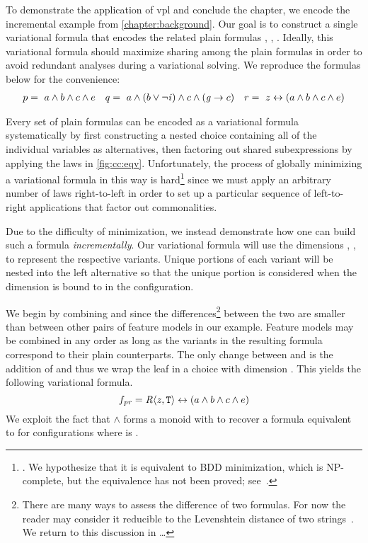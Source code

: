 %
To demonstrate the application of \ac{vpl} and conclude the chapter, we encode
the incremental example from \autoref{chapter:background}. Our goal is to
construct a single variational formula that encodes the related plain formulas
\pV{}, \qV{}, \rV{}. Ideally, this variational formula should maximize sharing
among the plain formulas in order to avoid redundant analyses during a
variational solving. We reproduce the formulas below for the convenience:
%
\begin{align*}
  p =\ a \wedge b \wedge c \wedge e && q=\ a \wedge (b \vee \neg \mathit{i}{}) \wedge c \wedge (\mathit{g}{} \rightarrow c) && r =~z \leftrightarrow (a \wedge b \wedge c \wedge e)
\end{align*}

%
Every set of plain formulas can be encoded as a variational formula
systematically by first constructing a nested choice containing all of the
individual variables as alternatives, then factoring out shared subexpressions
by applying the laws in \autoref{fig:cc:eqv}.
%
Unfortunately, the process of globally minimizing a variational formula in this
way is hard\footnote{\label{vpl:bdd}. We hypothesize that it is equivalent to
  BDD minimization, which is NP-complete, but the equivalence has not been
  proved; see~\cite{Walk14onward}.} since we must apply an arbitrary number of
laws right-to-left in order to set up a particular sequence of left-to-right
applications that factor out commonalities.

Due to the difficulty of minimization, we instead demonstrate how one can build
such a formula \emph{incrementally}.
%
Our variational formula will use the dimensions \dimP, \dimQ, \dimR{} to
represent the respective variants. Unique portions of each variant will be
nested into the left alternative so that the unique portion is considered when
the dimension is bound to \true in the configuration.

%
We begin by combining \pV{} and \rV{} since the differences\footnote{There are many ways to assess the difference of two
  formulas. For now the reader may consider it reducible to the Levenshtein
  distance of two strings~\cite{Levenshtein_SPD66}. We return to this discussion
  in \ldots{}} between the two are smaller than between other pairs of feature
models in our example. Feature models may be combined in any order as long as
the variants in the resulting formula correspond to their plain counterparts.
The only change between \pV{} and \rV{} is the addition of \zV{} and thus we
wrap the leaf in a choice with dimension \dimR. This yields the following
variational formula.
%
\begin{equation*}
  f_{\pV\rV} = \chc[\dimR]{\zV, \tru{}} \leftrightarrow (a \wedge b \wedge c \wedge e)
\end{equation*}
%
%
We exploit the fact that $\wedge$ forms a monoid with \tru{} to recover a
formula equivalent to \pV{} for configurations where \dimR{} is \false.

